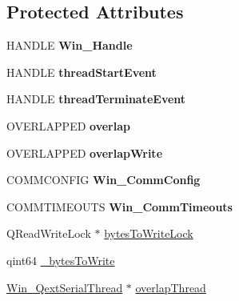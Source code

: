 \subsection*{Protected Attributes}
\begin{DoxyCompactItemize}
\item 
\mbox{\label{class_win___qext_serial_port_af6dae6bb1c6b51e766e551bc11f1721d}} 
H\+A\+N\+D\+LE {\bfseries Win\+\_\+\+Handle}
\item 
\mbox{\label{class_win___qext_serial_port_a92665fff67608297776788759720cb58}} 
H\+A\+N\+D\+LE {\bfseries thread\+Start\+Event}
\item 
\mbox{\label{class_win___qext_serial_port_a8bbf85df55ae3cfbce4948e9c2b1dbda}} 
H\+A\+N\+D\+LE {\bfseries thread\+Terminate\+Event}
\item 
\mbox{\label{class_win___qext_serial_port_a016eb4cecee3028d8bfa66146d262400}} 
O\+V\+E\+R\+L\+A\+P\+P\+ED {\bfseries overlap}
\item 
\mbox{\label{class_win___qext_serial_port_a6ecb45970bd21691c3dc70d17b12e6be}} 
O\+V\+E\+R\+L\+A\+P\+P\+ED {\bfseries overlap\+Write}
\item 
\mbox{\label{class_win___qext_serial_port_aa51a3047aa92b01531219215bb415dbb}} 
C\+O\+M\+M\+C\+O\+N\+F\+IG {\bfseries Win\+\_\+\+Comm\+Config}
\item 
\mbox{\label{class_win___qext_serial_port_aa3909dbcf96493e43d79e075e626d68b}} 
C\+O\+M\+M\+T\+I\+M\+E\+O\+U\+TS {\bfseries Win\+\_\+\+Comm\+Timeouts}
\item 
Q\+Read\+Write\+Lock $\ast$ \mbox{\hyperlink{class_win___qext_serial_port_a9dc5b1cba88ecda500921baf1cbe61a0}{bytes\+To\+Write\+Lock}}
\item 
qint64 \mbox{\hyperlink{class_win___qext_serial_port_a8e701bb9ef9ca4ff414b0cc89788fcab}{\+\_\+bytes\+To\+Write}}
\item 
\mbox{\hyperlink{class_win___qext_serial_thread}{Win\+\_\+\+Qext\+Serial\+Thread}} $\ast$ \mbox{\hyperlink{class_win___qext_serial_port_a9edfed65b7763c69d775a181c361e461}{overlap\+Thread}}
\end{DoxyCompactItemize}

